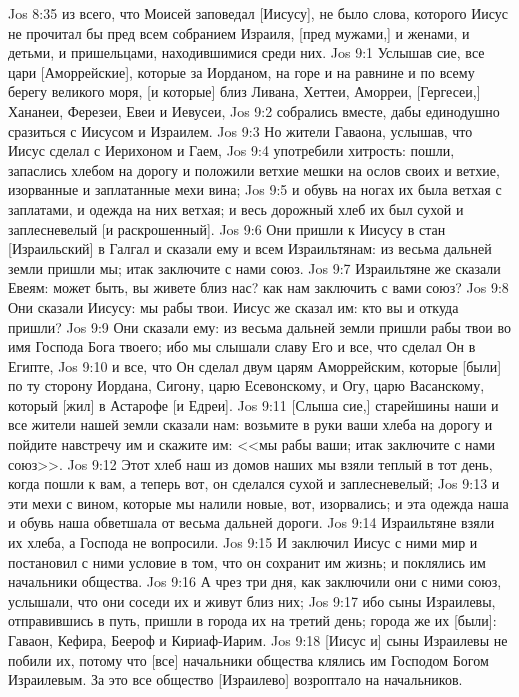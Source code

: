 \vs Jos 8:35 из всего, что Моисей заповедал [Иисусу], не было  слова, которого Иисус не прочитал бы пред всем собранием Израиля, [пред мужами,] и женами, и детьми, и пришельцами, находившимися среди них.
\vs Jos 9:1 Услышав сие, все цари [Аморрейские], которые за Иорданом, на горе и на равнине и по всему берегу великого моря, [и которые] близ Ливана, Хеттеи, Аморреи, [Гергесеи,] Хананеи, Ферезеи, Евеи и Иевусеи,
\vs Jos 9:2 собрались вместе, дабы единодушно сразиться с Иисусом и Израилем.
\vs Jos 9:3 Но жители Гаваона, услышав, что Иисус сделал с Иерихоном и Гаем,
\vs Jos 9:4 употребили хитрость: пошли, запаслись хлебом на дорогу и положили ветхие мешки на ослов своих и ветхие, изорванные и заплатанные мехи вина;
\vs Jos 9:5 и обувь на ногах их была ветхая с заплатами, и одежда на них ветхая; и весь дорожный хлеб их был сухой и заплесневелый [и раскрошенный].
\vs Jos 9:6 Они пришли к Иисусу в стан [Израильский] в Галгал и сказали ему и всем Израильтянам: из весьма дальней земли пришли мы; итак заключите с нами союз.
\vs Jos 9:7 Израильтяне же сказали Евеям: может быть, вы живете близ нас? как нам заключить с вами союз?
\vs Jos 9:8 Они сказали Иисусу: мы рабы твои. Иисус же сказал им: кто вы и откуда пришли?
\vs Jos 9:9 Они сказали ему: из весьма дальней земли пришли рабы твои во имя Господа Бога твоего; ибо мы слышали славу Его и все, что сделал Он в Египте,
\vs Jos 9:10 и все, что Он сделал двум царям Аморрейским, которые [были] по ту сторону Иордана, Сигону, царю Есевонскому, и Огу, царю Васанскому, который [жил] в Астарофе [и Едреи].
\vs Jos 9:11 [Слыша сие,] старейшины наши и все жители нашей земли сказали нам: возьмите в руки ваши хлеба на дорогу и пойдите навстречу им и скажите им: <<мы рабы ваши; итак заключите с нами союз>>.
\vs Jos 9:12 Этот хлеб наш из домов наших мы взяли теплый в тот день, когда пошли к вам, а теперь вот, он сделался сухой и заплесневелый;
\vs Jos 9:13 и эти мехи с вином, которые мы налили новые, вот, изорвались; и эта одежда наша и обувь наша обветшала от весьма дальней дороги.
\vs Jos 9:14 Израильтяне взяли их хлеба, а Господа не вопросили.
\vs Jos 9:15 И заключил Иисус с ними мир и постановил с ними условие в том, что он сохранит им жизнь; и поклялись им начальники общества.
\vs Jos 9:16 А чрез три дня, как заключили они с ними союз, услышали, что они соседи их и живут близ них;
\vs Jos 9:17 ибо сыны Израилевы, отправившись в путь, пришли в города их на третий день; города же их [были]: Гаваон, Кефира, Беероф и Кириаф-Иарим.
\vs Jos 9:18 [Иисус и] сыны Израилевы не побили их, потому что [все] начальники общества клялись им Господом Богом Израилевым. За это все общество [Израилево] возроптало на начальников.
